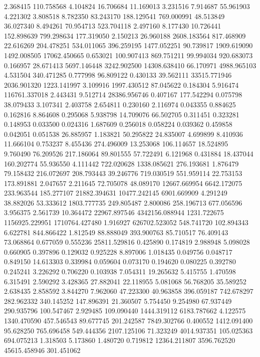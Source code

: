 2.368415
110.758568
4.104824
16.706684
11.169013
3.231516
7.914687
55.961903
4.221302
3.808518
8.782350
83.243170
188.129541
769.000991
48.513849
36.027340
8.494261
70.954713
523.704118
2.497160
8.177430
10.726441
152.898639
799.298634
177.319050
2.150213
26.960188
2608.183564
817.468909
22.616269
204.478251
534.011065
396.259195
1477.052251
90.739817
1909.619090
1492.008505
17062.450665
0.653021
100.907413
869.751211
99.994034
920.683073
0.166957
28.671413
5697.146448
3242.902500
14308.638410
66.170971
4988.965103
4.531504
340.471285
0.777998
96.809122
0.430133
39.562111
33515.771946
2036.901320
1223.141997
3.109916
1997.430512
87.045622
0.184304
5.916474
116761.337018
2.443431
9.512714
28386.956746
0.407167
177.542294
0.075798
38.079433
3.107341
2.403758
2.654811
0.230160
2.116974
0.043355
0.884625
0.162816
8.864608
0.295068
5.938798
14.709076
66.502705
0.311451
0.323281
0.148953
0.033500
0.024316
1.687609
0.256018
0.058224
0.039362
0.459858
0.042051
0.051538
26.885957
1.183821
50.295822
24.835007
4.699899
8.410936
11.666104
0.753237
8.455436
274.496009
13.253068
106.114657
18.524895
9.760490
76.209526
217.186064
89.801555
57.722491
6.121968
0.431884
18.437044
160.202774
55.936550
4.111442
722.020628
1338.085621
276.193681
1.876479
79.158432
216.072697
208.793443
39.246776
719.030519
551.959114
22.753153
173.891881
2.047657
2.211645
72.705078
48.089170
12667.669954
6642.172075
233.963544
185.277107
21882.394631
10477.242145
6901.669909
4.291249
38.882026
53.333612
1803.777735
249.805487
2.800086
258.196713
677.056596
3.956375
2.561739
10.364472
22967.897546
4342156.088944
1231.722675
1156925.229951
1710764.427480
1.916927
626702.523052
548.741720
102.894343
6.622781
844.866422
1.812549
88.888049
393.900763
85.710517
76.409143
73.068864
0.677059
0.555236
25811.529816
0.425890
0.174819
2.988948
5.098028
0.660905
0.397896
0.129032
0.925228
8.897006
1.018435
0.049756
0.048717
0.849150
14.613303
0.339984
0.059604
0.073170
0.194620
0.080225
0.392780
0.245241
3.226292
0.706220
0.103938
7.054311
19.265632
5.415755
1.470598
6.315491
2.590292
3.428365
27.882041
22.118955
5.081068
56.768205
35.589252
2.638435
2.858592
3.844270
7.962060
47.223300
40.963858
396.059187
742.678297
282.962332
340.145252
147.896391
21.360507
5.754450
9.254980
67.937449
290.935796
100.547467
2.929485
109.090440
1444.319112
6183.787662
4.122575
1340.470590
457.546543
89.677745
201.242587
7849.302766
0.400552
1412.091400
95.628250
765.696458
549.444356
2107.125106
71.323249
4014.937351
105.025363
694.075213
1.318503
5.173860
1.480720
0.719812
12364.211807
3596.762520
45615.458946
301.451062

